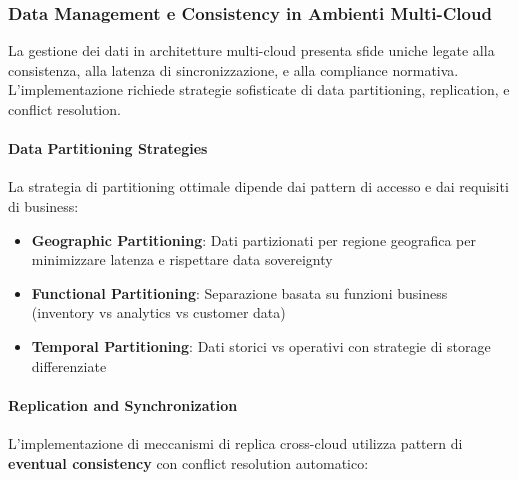 \subsubsection{Data Management e Consistency in Ambienti Multi-Cloud}

La gestione dei dati in architetture multi-cloud presenta sfide uniche legate alla consistenza, alla latenza di sincronizzazione, e alla compliance normativa. L'implementazione richiede strategie sofisticate di data partitioning, replication, e conflict resolution.

\paragraph{Data Partitioning Strategies}

La strategia di partitioning ottimale dipende dai pattern di accesso e dai requisiti di business:

\begin{itemize}
    \item \textbf{Geographic Partitioning}: Dati partizionati per regione geografica per minimizzare latenza e rispettare data sovereignty
    \item \textbf{Functional Partitioning}: Separazione basata su funzioni business (inventory vs analytics vs customer data)
    \item \textbf{Temporal Partitioning}: Dati storici vs operativi con strategie di storage differenziate
\end{itemize}

\paragraph{Replication and Synchronization}

L'implementazione di meccanismi di replica cross-cloud utilizza pattern di \textbf{eventual consistency} con conflict resolution automatico:

